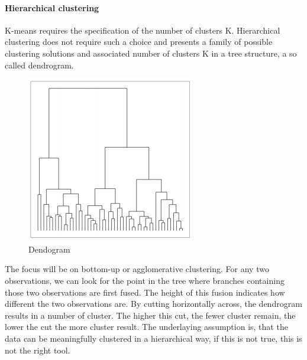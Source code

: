\documentclass[../document.tex]{subfiles}
\begin{document}
	\paragraph{Hierarchical clustering}
	K-means requires the specification of the number of clusters K. Hierarchical clustering does not require such a choice and presents a family of possible clustering solutions and associated number of clusters K in a tree structure, a so called dendrogram.
	\begin{figure}
		\centering
		\includegraphics[width=0.7\linewidth]{pictures/dendogram}
		\caption{Dendogram}
		\label{fig:dendogram}
	\end{figure}

	The focus will be on bottom-up or agglomerative clustering. For any two observations, we can look for the point in the tree where branches containing those two observations are first fused. The height of this fusion indicates how different the two observations are. By cutting horizontally across, the dendrogram results in a number of cluster. The higher this cut, the fewer cluster remain, the lower the cut the more cluster result. The underlaying assumption is, that the data can be meaningfully clustered in a hierarchical way, if this is not true, this is not the right tool. 
\end{document}
